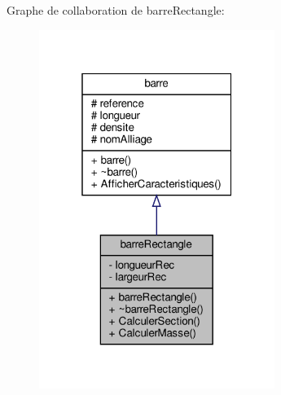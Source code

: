 Graphe de collaboration de barre\+Rectangle\+:
\nopagebreak
\begin{figure}[H]
\begin{center}
\leavevmode
\includegraphics[width=217pt]{classbarre_rectangle__coll__graph}
\end{center}
\end{figure}
